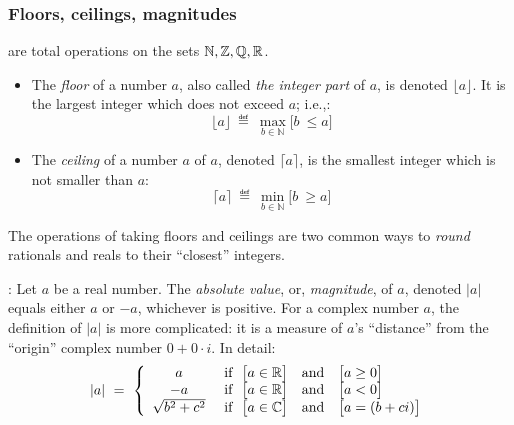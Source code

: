 \subsubsection{Floors, ceilings, magnitudes}

are total operations on the sets $\mathbb{N}, \mathbb{Z}, \mathbb{Q}, \mathbb{R}$.
\begin{itemize}
\item
The {\it floor} of a number $a$, also called {\it the integer part} of $a$, is denoted $\lfloor a \rfloor$.  It is the largest integer which does not exceed $a$; i.e.,:
\[
\lfloor a \rfloor \ \eqdef \ \max_{b \in {\mathbb{N}}} \Big[ b \ \leq a \Big]
\]
\item
The {\it ceiling} of a number $a$ of $a$, denoted $\lceil a \rceil$, is the smallest integer which is 
not smaller than $a$:
\[
\lceil a \rceil \ \eqdef \ \min_{b \in {\mathbb{N}}} \Big[ b \ \geq a \Big]
\]
\end{itemize}
The operations of taking floors and ceilings are two common ways to {\em round} rationals and reals to their ``closest'' integers.

\medskip

:
Let $a$ be a real number.  The {\it absolute value}, or, {\it magnitude}, of $a$, denoted $|a|$ equals either $a$ or $-a$, whichever is positive.  For a complex number $a$, the definition of
$|a|$ is more complicated: it is a measure of $a$'s ``distance'' from the ``origin'' complex number $0 + 0 \cdot i$.  In detail:
\[
|a| \ = \ \left\{
\begin{array}{cl}
a & \mbox{ if } \ \big[a \in \mathbb{R} \big] \ \ \mbox{ and } \ \ \big[a \geq 0\big] \\
-a & \mbox{ if } \ \big[a \in \mathbb{R}\big] \ \ \mbox{ and } \ \ \big[a < 0\big] \\
\sqrt{b^2 + c^2} &  \mbox{ if } \ \big[a \in \mathbb{C}\big]  \ \ \mbox{ and }  \ \ \big[a = (b+ci)\big]
\end{array}
\right.
\]

